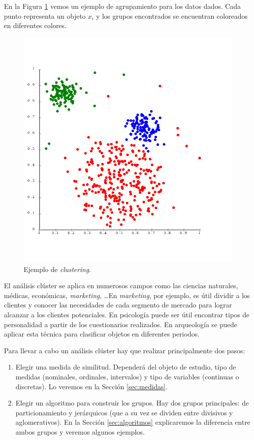 \documentclass[a4paper, 20pt]{article}
\begin{document}
En la Figura \ref{fig:ejemplo1} vemos un ejemplo de agrupamiento para los datos dados. Cada punto representa un objeto $x_i$ y los grupos encontrados se encuentran coloreados en diferentes colores.

\begin{figure}[H]
	\centering
	\includegraphics[scale=0.3]{ejemplo}
	\caption{Ejemplo de \textit{clustering}. \cite{chire_deutsch:_2011}}
	\label{fig:ejemplo1}
\end{figure}

El análisis clúster se aplica en numerosos campos como las ciencias naturales, médicas, económicas, \textit{marketing}, \dots En \textit{marketing}, por ejemplo, es útil dividir a los clientes y conocer las necesidades de cada segmento de mercado para lograr alcanzar a los clientes potenciales. En psicología puede ser útil encontrar tipos de personalidad a partir de los cuestionarios realizados. En arqueología se puede aplicar esta técnica para clasificar objetos en diferentes periodos.

Para llevar a cabo un análisis clúster hay que realizar principalmente dos pasos:

\begin{enumerate}
\item Elegir una medida de similitud. Dependerá del objeto de estudio, tipo de medidas (nominales, ordinales, intervalos) y tipo de variables (continuas o discretas). Lo veremos en la Sección \ref{sec:medidas}.
\item Elegir un algoritmo para construir los grupos. Hay dos grupos principales: de particionamiento y jerárquicos (que a su vez se dividen entre divisivos y aglomerativos). En la Sección \ref{sec:algoritmos} explicaremos la diferencia entre ambos grupos y veremos algunos ejemplos.
\end{enumerate}
\end{document}
